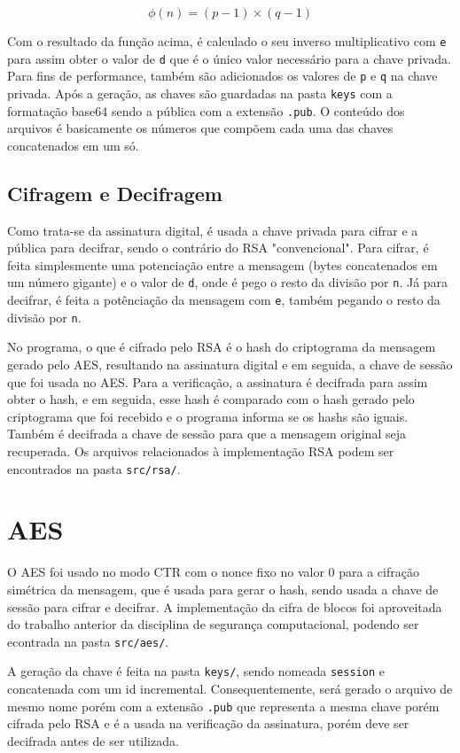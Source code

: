 \documentclass[12pt]{article}
\begin{document}
\[
    \phi(n) = (p-1) \times (q-1)
\]

Com o resultado da função acima, é calculado o seu inverso multiplicativo com \texttt{e} para assim obter o valor de \texttt{d} que é o único valor necessário para a chave privada. Para fins de performance, também são adicionados os valores de \texttt{p} e \texttt{q} na chave privada. Após a geração, as chaves são guardadas na pasta \texttt{keys} com a formatação base64 sendo a pública com a extensão \texttt{.pub}. O conteúdo dos arquivos é basicamente os números que compõem cada uma das chaves concatenados em um só.

\subsection{Cifragem e Decifragem}

Como trata-se da assinatura digital, é usada a chave privada para cifrar e a pública para decifrar, sendo o contrário do RSA "convencional". Para cifrar, é feita simplesmente uma potenciação entre a mensagem (bytes concatenados em um número gigante) e o valor de \texttt{d}, onde é pego o resto da divisão por \texttt{n}. Já para decifrar, é feita a potênciação da mensagem com \texttt{e}, também pegando o resto da divisão por \texttt{n}.

No programa, o que é cifrado pelo RSA é o hash do criptograma da mensagem gerado pelo AES, resultando na assinatura digital e em seguida, a chave de sessão que foi usada no AES. Para a verificação, a assinatura é decifrada para assim obter o hash, e em seguida, esse hash é comparado com o hash gerado pelo criptograma que foi recebido e o programa informa se os hashs são iguais. Também é decifrada a chave de sessão para que a mensagem original seja recuperada. Os arquivos relacionados à implementação RSA podem ser encontrados na pasta \texttt{src/rsa/}.

\section{AES}

O AES foi usado no modo CTR com o nonce fixo no valor 0 para a cifração simétrica da mensagem, que é usada para gerar o hash, sendo usada a chave de sessão para cifrar e decifrar. A implementação da cifra de blocos foi aproveitada do trabalho anterior da disciplina de segurança computacional, podendo ser econtrada na pasta \texttt{src/aes/}.

A geração da chave é feita na pasta \texttt{keys/}, sendo nomeada \texttt{session} e concatenada com um id incremental. Consequentemente, será gerado o arquivo de mesmo nome porém com a extensão \texttt{.pub} que representa a mesma chave porém cifrada pelo RSA e é a usada na verificação da assinatura, porém deve ser decifrada antes de ser utilizada. 
\end{document}
